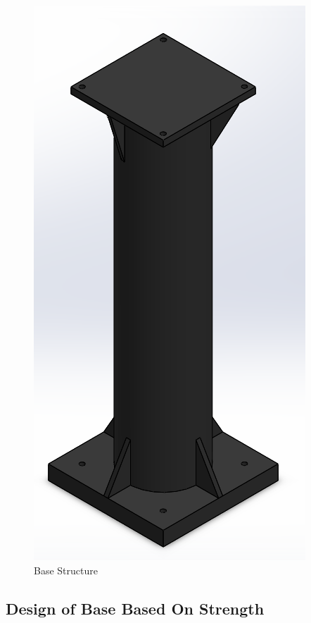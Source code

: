 \begin{figure}[H]
	\centering
	\includegraphics[scale=0.4]{BaseStructure}
	\caption{Base Structure}
\end{figure}

\vspace{0.6 cm}

\subsection {Design of Base Based On Strength}
